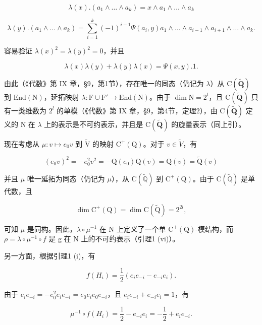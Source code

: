 \[
\lambda (x). (a _ {1} \wedge \dots \wedge a _ {k}) = x \wedge a _ {1} \wedge \dots \wedge a _ {k}
\]

\[
\lambda (y). \left(a _ {1} \wedge \dots \wedge a _ {k}\right) = \sum_ {i = 1} ^ {k} (- 1) ^ {i - 1} \Psi \left(a _ {i}, y\right) a _ {1} \wedge \dots \wedge a _ {i - 1} \wedge a _ {i + 1} \wedge \dots \wedge a _ {k}.
\]

容易验证 \(\lambda (x)^{2} = \lambda (y)^{2} = 0\)，并且

\[
\lambda (x) \lambda (y) + \lambda (y) \lambda (x) = \Psi (x, y). 1.
\]

由此（《代数》第 IX 章，§9，第1节），存在唯一的同态（仍记为 \(\lambda\)）从 \(\mathrm{C}(\tilde{\mathbf{Q}})\) 到 \(\mathrm{End}(\mathrm{N})\)，延拓映射 \(\lambda : \mathrm{F} \cup \mathrm{F}' \to \mathrm{End}(\mathrm{N})\)。由于 \(\dim \mathrm{N} = 2^l\)，且 \(\mathrm{C}(\tilde{\mathbf{Q}})\) 只有一类维数为 \(2^l\) 的单模（《代数》第 IX 章，§9，第4节，定理2），由 \(\mathrm{C}(\tilde{\mathbf{Q}})\) 定义的 \(\mathrm{N}\) 在 \(\lambda\) 上的表示是不可约表示，并且是 \(\mathrm{C}(\tilde{\mathbf{Q}})\) 的旋量表示（同上引）。

现在考虑从 \(\mu:v\mapsto e_{0}v\) 到 \(\tilde{\mathrm{V}}\) 的映射 \(\mathrm{C}^{+}(\mathrm{Q})\)。对于 \(v\in\tilde{V}\)，有

\[
(e _ {0} v) ^ {2} = - e _ {0} ^ {2} v ^ {2} = - \mathrm{Q} (e _ {0}) \mathrm{Q} (v) = \mathrm{Q} (v) = \tilde {\mathrm{Q}} (v)
\]

并且 \(\mu\) 唯一延拓为同态（仍记为 \(\mu\)），从 \(\mathrm{C}(\tilde{\mathbb{Q}})\) 到 \(\mathrm{C}^{+}(\mathrm{Q})\)。由于 \(\mathrm{C}(\tilde{\mathbb{Q}})\) 是单代数，且

\[
\dim \mathrm{C} ^ {+} (\mathrm{Q}) = \dim \mathrm{C} (\tilde {\mathrm{Q}}) = 2 ^ {2 l},
\]

可知 \(\mu\) 是同构。因此，\(\lambda \circ \mu^{-1}\) 在 N 上定义了一个单 \(\mathrm{C}^{+}(\mathrm{Q})\)-模结构，而 \(\rho = \lambda \circ \mu^{-1} \circ f\) 是 g 在 N 上的不可约表示（引理1 (vi)）。

另一方面，根据引理1 (i)，有

\[
f (H _ {i}) = \frac {1}{2} (e _ {i} e _ {- i} - e _ {- i} e _ {i}).
\]

由于 \(e_{i}e_{-i} = -e_{0}^{2}e_{i}e_{-i} = e_{0}e_{i}e_{0}e_{-i}\)，且 \(e_{i}e_{-i} + e_{-i}e_{i} = 1\)，有

\[
\mu^ {- 1} \circ f (H _ {i}) = \frac {1}{2} - e _ {- i} e _ {i} = - \frac {1}{2} + e _ {i} e _ {- i}.
\]

